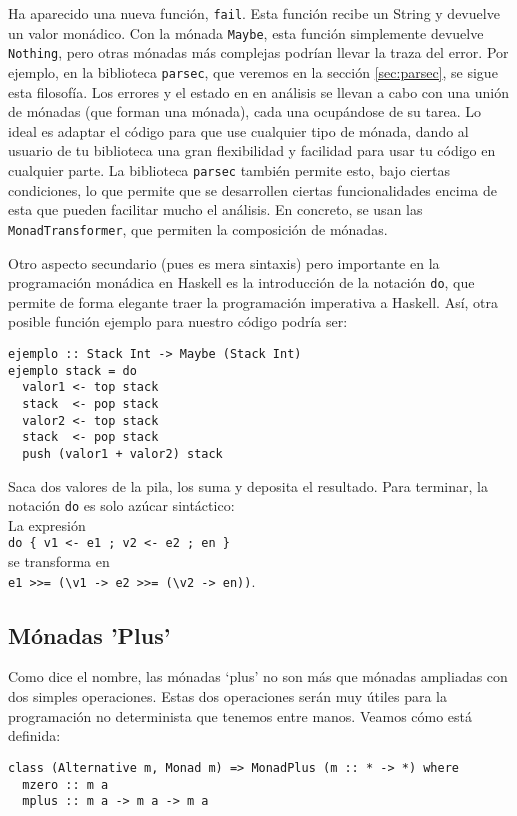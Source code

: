 \documentclass[class=article, crop=false]{standalone}
\begin{document}
Ha aparecido una nueva función, \verb`fail`. Esta función recibe un String y devuelve un
valor monádico. Con la mónada \verb`Maybe`, esta función simplemente devuelve \verb`Nothing`,
pero otras mónadas más complejas podrían llevar la traza del error. Por ejemplo, en la
biblioteca \verb`parsec`, que veremos en la sección \ref{sec:parsec}, se sigue esta
filosofía. Los errores y el estado en en análisis se llevan a cabo con una unión de mónadas
(que forman una mónada), cada una ocupándose de su tarea. Lo ideal es adaptar el código para
que use cualquier tipo de mónada, dando al usuario de tu biblioteca una gran flexibilidad y
facilidad para usar tu código en cualquier parte. La biblioteca \verb`parsec` también permite
esto, bajo ciertas condiciones, lo que permite que se desarrollen ciertas funcionalidades
encima de esta que pueden facilitar mucho el análisis. En concreto, se usan las
\verb`MonadTransformer`, que permiten la composición de mónadas.

Otro aspecto secundario (pues es mera sintaxis) pero importante en la programación monádica
en Haskell es la introducción de la notación \verb`do`, que permite de forma elegante traer
la programación imperativa a Haskell. Así, otra posible función ejemplo para nuestro código
podría ser:

\begin{verbatim}
ejemplo :: Stack Int -> Maybe (Stack Int)
ejemplo stack = do
  valor1 <- top stack
  stack  <- pop stack
  valor2 <- top stack
  stack  <- pop stack
  push (valor1 + valor2) stack
\end{verbatim}

Saca dos valores de la pila, los suma y deposita el resultado. Para terminar, la notación
\verb`do` es solo azúcar sintáctico: \\
La expresión \\
\verb`do { v1 <- e1 ; v2 <- e2 ; en }` \\
se transforma en \\
\verb`e1 >>= (\v1 -> e2 >>= (\v2 -> en))`.

\subsection{Mónadas 'Plus'}
Como dice el nombre, las mónadas `plus' no son más que mónadas ampliadas con dos simples
operaciones. Estas dos operaciones serán muy útiles para la programación no determinista que
tenemos entre manos. Veamos cómo está definida:

\begin{verbatim}
class (Alternative m, Monad m) => MonadPlus (m :: * -> *) where
  mzero :: m a
  mplus :: m a -> m a -> m a
\end{verbatim}
\end{document}
